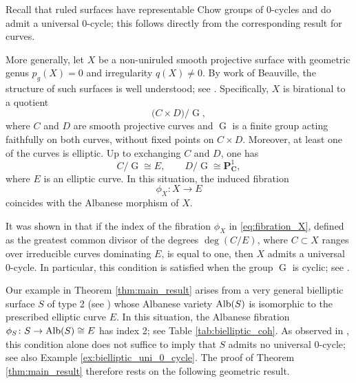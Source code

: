 \documentclass[11pt,letterpaper]{amsart}
\newcommand{\Alb}{\textnormal{Alb}}
\numberwithin{equation}{section}
\theoremstyle{definition}
\theoremstyle{remark}
\newcommand{\bbC}{\mathbf{C}}
\newcommand{\bbP}{\mathbf{P}}
\DeclareMathOperator{\Gi}{G}
\begin{document}
Recall that ruled surfaces have representable Chow groups of $0$-cycles and do admit a universal $0$-cycle; this follows directly from the corresponding result for curves.\par 
More generally, let $X$ be a non-uniruled smooth projective surface with geometric genus $p_{g}(X)=0$ and irregularity $q(X)\neq0$. By work of Beauville, the structure of such surfaces is well understood; see \cite[Chapter VI]{beauville_surfaces}. Specifically, $X$ is birational to a quotient \begin{equation*}\label{eq:structure_X}\bigl(C\times D\bigr)/\Gi,\end{equation*}
where $C$ and $D$ are smooth projective curves and $\Gi$ is a finite group acting faithfully on both curves, without fixed points on $C \times D$. Moreover, at least one of the curves is elliptic. Up to exchanging $C$ and $D$, one has $$C/\Gi\cong E,\qquad D/\Gi\cong\bbP^{1}_{\bbC},$$ where $E$ is an elliptic curve. In this situation, the induced fibration \begin{equation}\label{eq:fibration_X}\phi_{X}\colon X\longrightarrow E\end{equation} coincides with the Albanese morphism of $X$.\par
It was shown in \cite{voisin_a} that if the index of the fibration $\phi_X$ in \eqref{eq:fibration_X}, defined as the greatest common divisor of the degrees $\deg(C/E)$, where $C \subset X$ ranges over irreducible curves dominating $E$, is equal to one, then $X$ admits a universal $0$-cycle. In particular, this condition is satisfied when the group $\Gi$ is cyclic; see \cite[Proposition 4.4]{voisin_a}.\par 
Our example in Theorem \ref{thm:main_result} arises from a very general bielliptic surface $S$ of type 2 (see \cite{bielliptic, bielliptic_suwa}) whose Albanese variety $\Alb(S)$ is isomorphic to the prescribed elliptic curve $E$. In this situation, the Albanese fibration $\phi_{S}\colon S\to \Alb(S)\cong E$ has index 2; see Table \ref{tab:bielliptic_coh}. As observed in \cite[$\S 2.2$]{voisin_a}, this condition alone does not suffice to imply that $S$ admits no universal $0$-cycle; see also Example \ref{ex:bielliptic_uni_0_cycle}. The proof of Theorem \ref{thm:main_result} therefore rests on the following geometric result.
\end{document}
